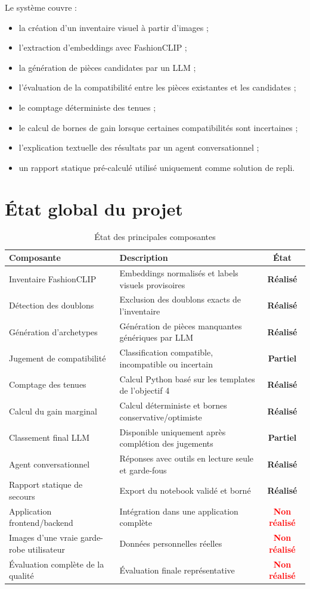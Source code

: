 \documentclass[11pt,a4paper]{article}
\newcommand{\done}{\textcolor{success}{\textbf{Réalisé}}}
\newcommand{\partialdone}{\textcolor{warning}{\textbf{Partiel}}}
\newcommand{\notdone}{\textcolor{red}{\textbf{Non réalisé}}}
\begin{document}
Le système couvre :

\begin{itemize}[leftmargin=*]
    \item la création d'un inventaire visuel à partir d'images ;
    \item l'extraction d'embeddings avec FashionCLIP ;
    \item la génération de pièces candidates par un LLM ;
    \item l'évaluation de la compatibilité entre les pièces existantes et les
    candidates ;
    \item le comptage déterministe des tenues ;
    \item le calcul de bornes de gain lorsque certaines compatibilités sont
    incertaines ;
    \item l'explication textuelle des résultats par un agent conversationnel ;
    \item un rapport statique pré-calculé utilisé uniquement comme solution de
    repli.
\end{itemize}

\section{État global du projet}

\begin{table}[H]
\centering
\caption{État des principales composantes}
\begin{tabularx}{\textwidth}{>{\raggedright\arraybackslash}p{4.2cm} X c}
\toprule
\textbf{Composante} & \textbf{Description} & \textbf{État} \\
\midrule
Inventaire FashionCLIP & Embeddings normalisés et labels visuels provisoires &
\done \\
Détection des doublons & Exclusion des doublons exacts de l'inventaire &
\done \\
Génération d'archetypes & Génération de pièces manquantes génériques par LLM &
\done \\
Jugement de compatibilité & Classification compatible, incompatible ou incertain &
\partialdone \\
Comptage des tenues & Calcul Python basé sur les templates de l'objectif 4 &
\done \\
Calcul du gain marginal & Calcul déterministe et bornes conservative/optimiste &
\done \\
Classement final LLM & Disponible uniquement après complétion des jugements &
\partialdone \\
Agent conversationnel & Réponses avec outils en lecture seule et garde-fous &
\done \\
Rapport statique de secours & Export du notebook validé et borné &
\done \\
Application frontend/backend & Intégration dans une application complète &
\notdone \\
Images d'une vraie garde-robe utilisateur & Données personnelles réelles &
\notdone \\
Évaluation complète de la qualité & Évaluation finale représentative &
\notdone \\
\bottomrule
\end{tabularx}
\end{table}
\end{document}
